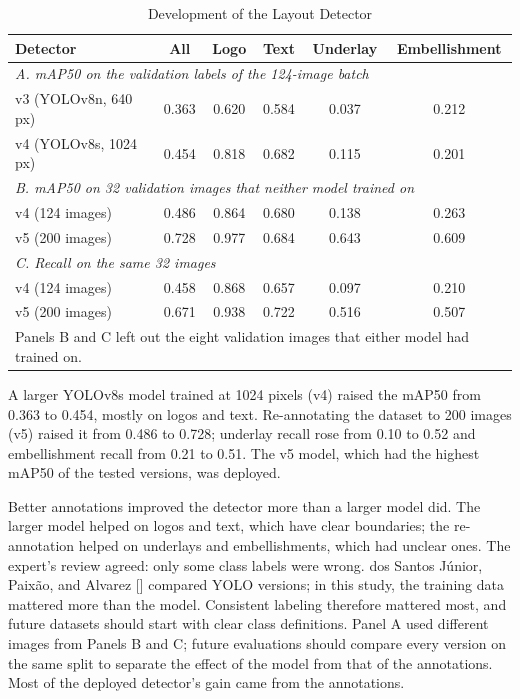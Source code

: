 \begin{refsection}
\begin{table}[!ht]
\centering
\caption{Development of the Layout Detector}
\label{tab:yolo-dev}
\begin{tabular}{l c c c c c}
\hline
\textbf{Detector} & \textbf{All} & \textbf{Logo} & \textbf{Text} & \textbf{Underlay} & \textbf{Embellishment} \\ \hline
\multicolumn{6}{l}{\textit{A. mAP50 on the validation labels of the 124-image batch}} \\
v3 (YOLOv8n, 640 px) & 0.363 & 0.620 & 0.584 & 0.037 & 0.212 \\
v4 (YOLOv8s, 1024 px) & 0.454 & 0.818 & 0.682 & 0.115 & 0.201 \\ \hline
\multicolumn{6}{l}{\textit{B. mAP50 on 32 validation images that neither model trained on}} \\
v4 (124 images) & 0.486 & 0.864 & 0.680 & 0.138 & 0.263 \\
v5 (200 images) & 0.728 & 0.977 & 0.684 & 0.643 & 0.609 \\ \hline
\multicolumn{6}{l}{\textit{C. Recall on the same 32 images}} \\
v4 (124 images) & 0.458 & 0.868 & 0.657 & 0.097 & 0.210 \\
v5 (200 images) & 0.671 & 0.938 & 0.722 & 0.516 & 0.507 \\ \hline
\multicolumn{6}{p{0.86\textwidth}}{\footnotesize Panels B and C left out the eight validation images that either model had trained on.}
\end{tabular}
\end{table}

A larger YOLOv8s model trained at 1024 pixels (v4) raised the mAP50 from 0.363 to 0.454, mostly on logos and text. Re-annotating the dataset to 200 images (v5) raised it from 0.486 to 0.728; underlay recall rose from 0.10 to 0.52 and embellishment recall from 0.21 to 0.51. The v5 model, which had the highest mAP50 of the tested versions, was deployed.

Better annotations improved the detector more than a larger model did. The larger model helped on logos and text, which have clear boundaries; the re-annotation helped on underlays and embellishments, which had unclear ones. The expert's review agreed: only some class labels were wrong. dos Santos Júnior, Paixão, and Alvarez [\citeyear{dosSantosJunior2025}] compared YOLO versions; in this study, the training data mattered more than the model. Consistent labeling therefore mattered most, and future datasets should start with clear class definitions. Panel A used different images from Panels B and C; future evaluations should compare every version on the same split to separate the effect of the model from that of the annotations. Most of the deployed detector's gain came from the annotations.


\end{refsection}
